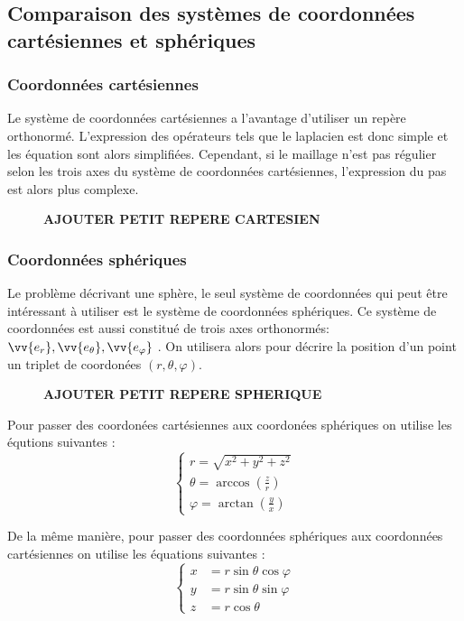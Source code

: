 \documentclass[fleqn]{article}
\renewcommand{\phi}{\varphi}
\begin{document}
\subsection{Comparaison des systèmes de coordonnées cartésiennes et sphériques}
\subsubsection{Coordonnées cartésiennes}
Le système de coordonnées cartésiennes a l'avantage d'utiliser un repère orthonormé. L'expression des opérateurs tels que le laplacien est donc simple et les équation sont alors simplifiées. Cependant, si le maillage n'est pas régulier selon les trois axes du système de coordonnées cartésiennes, l'expression du pas est alors plus complexe.

\begin{figure}[H]
    \centering
    \textbf{AJOUTER PETIT REPERE CARTESIEN}
\end{figure}

\subsubsection{Coordonnées sphériques}
Le problème décrivant une sphère, le seul système de coordonnées qui peut être intéressant à utiliser est le système de coordonnées sphériques. Ce système de coordonnées est aussi constitué de trois axes orthonormés:$\vv{e_r}, \vv{e_\theta}, \vv{e_\phi}$ . On utilisera alors pour décrire la position d'un point un triplet de coordonées $(r, \theta, \phi)$. 

\begin{figure}[H]
    \centering
    \textbf{AJOUTER PETIT REPERE SPHERIQUE}
\end{figure}


Pour passer des coordonées cartésiennes aux coordonées sphériques on utilise les équtions suivantes :
\begin{equation}
    \begin{cases}
        r = \sqrt{x^2 + y^2 + z^2} \\
        \theta = \arccos \left( \frac{z}{r} \right)\\
        \phi = \arctan \left( \frac{y}{x} \right)
    \end{cases}
\end{equation}

De la même manière, pour passer des coordonnées sphériques aux coordonnées cartésiennes on utilise les équations suivantes :
\begin{equation}
    \begin{cases}
        x&=r \sin \theta \cos \varphi \\y&=r \sin \theta \sin \varphi \\z&=r \cos \theta 
    \end{cases}
\end{equation}
\end{document}

